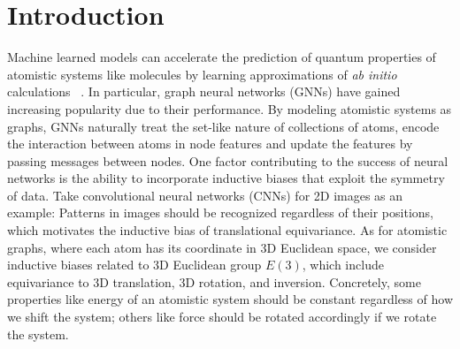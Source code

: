 \vspace{-6mm}
\section{Introduction}
\vspace{-4mm}
Machine learned models can accelerate the prediction of quantum properties of atomistic systems like molecules by learning approximations of \textit{ab initio} calculations ~\citep{neural_message_passing_quantum_chemistry, deep_potential_molecular_dynamics, push_limit_of_md_100m, dimenet_pp, nequip,  deep_potential_molecular_dynamics_simulation, se3_wavefunction, gemnet_xl, quantum_scaling}.
In particular, graph neural networks (GNNs) have gained increasing popularity due to their performance.
By modeling atomistic systems as graphs, GNNs naturally treat the set-like nature of collections of atoms, encode the interaction between atoms in node features and update the features by passing messages between nodes.
One factor contributing to the success of neural networks is the ability to incorporate inductive biases that exploit the symmetry of data.
Take convolutional neural networks (CNNs) for 2D images as an example: Patterns in images should be recognized regardless of their positions, which motivates the inductive bias of translational equivariance. %
As for atomistic graphs, where each atom has its coordinate in 3D Euclidean space, we consider inductive biases related to 3D Euclidean group $E(3)$, which include equivariance to 3D translation, 3D rotation, and inversion.
Concretely, some properties like energy of an atomistic system should be constant regardless of how we shift the system; others like force should be rotated accordingly if we rotate the system.
